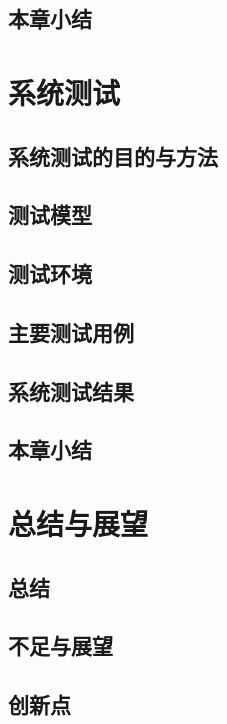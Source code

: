 \documentclass{xduugthesis}
\begin{document}
\section{本章小结}


\chapter{系统测试}
\section{系统测试的目的与方法}
\section{测试模型}
\section{测试环境}
\section{主要测试用例}
\section{系统测试结果}
\section{本章小结}

\chapter{总结与展望}
\section{总结}
\section{不足与展望}
\section{创新点}
\end{document}
